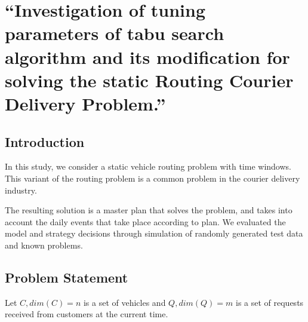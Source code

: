 \documentclass[]{TAACpaper}
\begin{document}

\def\dd#1#2{\frac{\partial#1}{\partial#2}}
\section{
``Investigation of tuning parameters of tabu search algorithm and its modification  for solving the static Routing Courier Delivery Problem.'' 
}



\subsection{Introduction}
In this study, we consider a static vehicle routing problem with time windows. This variant of the routing problem is a common problem in the courier delivery industry. 

The resulting solution is a master plan that solves the problem, and takes into account the daily events that take place according to plan. We evaluated the model and strategy decisions through simulation of randomly generated test data and known problems.


\subsection{Problem Statement}
Let $C,dim(C)=n$ is a set of vehicles and $Q,dim(Q)=m$ is a set of requests received from customers at the current time.
\end{document}
